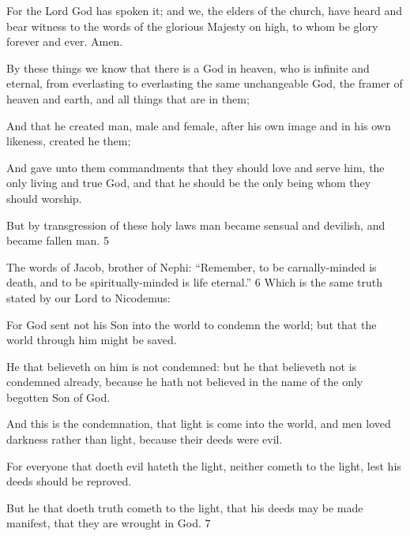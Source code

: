 For the Lord God has spoken it; and we, the elders of the church, have heard and bear
witness to the words of the glorious Majesty on high, to whom be glory forever and ever.
Amen.

By these things we know that there is a God in heaven, who is infinite and eternal, from
everlasting to everlasting the same unchangeable God, the framer of heaven and earth, and all
things that are in them;

And that he created man, male and female, after his own image and in his own likeness,
created he them;

And gave unto them commandments that they should love and serve him, the only living and
true God, and that he should be the only being whom they should worship.

But by transgression of these holy laws man became sensual and devilish, and became fallen
man. 5

The words of Jacob, brother of Nephi: ``Remember, to be carnally-minded is death, and to be
spiritually-minded is life eternal.'' 6 Which is the same truth stated by our Lord to
Nicodemus:

For God sent not his Son into the world to condemn the world; but that the world through
him might be saved.

He that believeth on him is not condemned: but he that believeth not is condemned already,
because he hath not believed in the name of the only begotten Son of God.

And this is the condemnation, that light is come into the world, and men loved darkness
rather than light, because their deeds were evil.

For everyone that doeth evil hateth the light, neither cometh to the light, lest his deeds should
be reproved.

But he that doeth truth cometh to the light, that his deeds may be made manifest, that they are
wrought in God. 7

